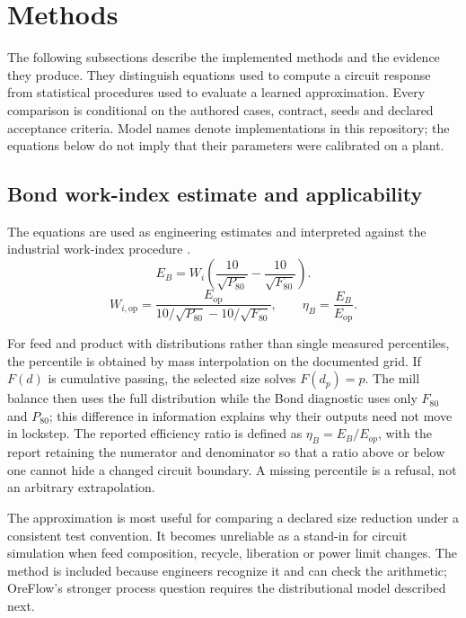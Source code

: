 \documentclass[10pt]{article}
\begin{document}
\section{Methods}\label{methods}

The following subsections describe the implemented methods and the
evidence they produce. They distinguish equations used to compute a
circuit response from statistical procedures used to evaluate a learned
approximation. Every comparison is conditional on the authored cases,
contract, seeds and declared acceptance criteria. Model names denote
implementations in this repository; the equations below do not imply
that their parameters were calibrated on a plant.

\subsection{Bond work-index estimate and
applicability}\label{bond-work-index-estimate-and-applicability}

\label{method-bond}

The equations are used as engineering estimates and interpreted against
the industrial work-index procedure
\cite{bond1952,gmg2021,kick1885,rittinger1867}. \begin{equation}
E_B=W_i\left(\frac{10}{\sqrt{P_{80}}}-\frac{10}{\sqrt{F_{80}}}\right).
\end{equation} \begin{equation}
W_{i,\mathrm{op}}=\frac{E_{\mathrm{op}}}{10/\sqrt{P_{80}}-10/\sqrt{F_{80}}},
\qquad \eta_B=\frac{E_B}{E_{\mathrm{op}}}.
\end{equation}

For feed and product with distributions rather than single measured
percentiles, the percentile is obtained by mass interpolation on the
documented grid. If \(F(d)\) is cumulative passing, the selected size
solves \(F(d_p)=p\). The mill balance then uses the full distribution
while the Bond diagnostic uses only \(F_{80}\) and \(P_{80}\); this
difference in information explains why their outputs need not move in
lockstep. The reported efficiency ratio is defined as
\(\eta_B=E_B/E_{op}\), with the report retaining the numerator and
denominator so that a ratio above or below one cannot hide a changed
circuit boundary. A missing percentile is a refusal, not an arbitrary
extrapolation.

The approximation is most useful for comparing a declared size reduction
under a consistent test convention. It becomes unreliable as a stand-in
for circuit simulation when feed composition, recycle, liberation or
power limit changes. The method is included because engineers recognize
it and can check the arithmetic; OreFlow's stronger process question
requires the distributional model described next.
\end{document}
